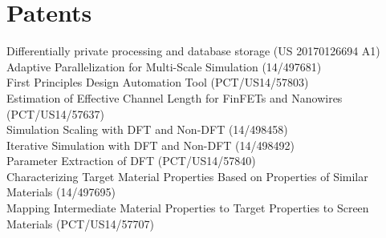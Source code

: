 \documentclass[11pt, a4paper]{article}
\begin{document}
\section*{{\color{mycolor4}\textbf{Patents}}}
\noindent
Differentially private processing and database storage (US 20170126694 A1) \\
Adaptive Parallelization for Multi-Scale Simulation (14/497681) \\
First Principles Design Automation Tool (PCT/US14/57803) \\
Estimation of Effective Channel Length for FinFETs and Nanowires (PCT/US14/57637) \\
Simulation Scaling with DFT and Non-DFT (14/498458) \\
Iterative Simulation with DFT and Non-DFT (14/498492) \\
Parameter Extraction of DFT (PCT/US14/57840) \\
Characterizing Target Material Properties Based on Properties of Similar Materials (14/497695) \\
Mapping Intermediate Material Properties to Target Properties to Screen Materials (PCT/US14/57707)\\
\end{document}
